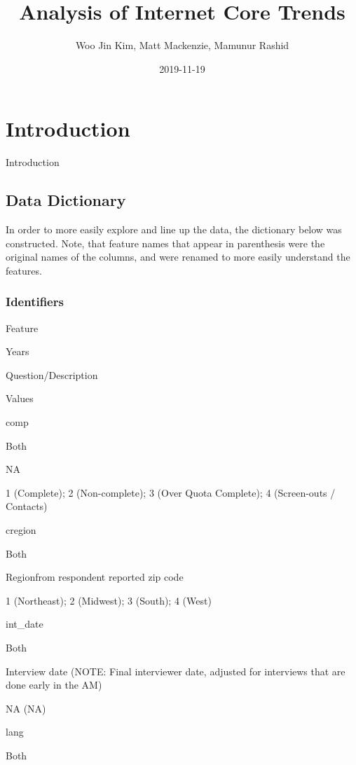 \documentclass[]{book}
\title{Analysis of Internet Core Trends}
\author{Woo Jin Kim, Matt Mackenzie, Mamunur Rashid}
\date{2019-11-19}
\begin{document}
\maketitle

{
\hypersetup{linkcolor=black}
\setcounter{tocdepth}{1}
\tableofcontents
}
\chapter*{Introduction}\label{introduction}

Introduction

\section*{Data Dictionary}\label{data-dictionary}

In order to more easily explore and line up the data, the dictionary
below was constructed. Note, that feature names that appear in
parenthesis were the original names of the columns, and were renamed to
more easily understand the features.

\subsection*{Identifiers}\label{identifiers}

Feature

Years

Question/Description

Values

comp

Both

NA

1 (Complete); 2 (Non-complete); 3 (Over Quota Complete); 4 (Screen-outs
/ Contacts)

cregion

Both

Regionfrom respondent reported zip code

1 (Northeast); 2 (Midwest); 3 (South); 4 (West)

int\_date

Both

Interview date (NOTE: Final interviewer date, adjusted for interviews
that are done early in the AM)

NA (NA)

lang

Both
\end{document}
